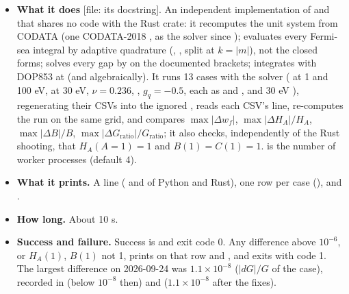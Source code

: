 \begin{itemize}
  \item \textbf{What it does} [file: its docstring]. An independent implementation of  and  that shares no code with the Rust crate: it recomputes the unit system from CODATA (one CODATA-2018 , as the solver since ); evaluates every Fermi-sea integral by adaptive quadrature (, , split at $k = |m|$), not the closed forms; solves every gap by  on the documented brackets; integrates  with DOP853 at  (and  algebraically). It runs 13 cases with the solver ( at 1 and 100 eV,  at 30 eV,  $\nu = 0.236$, ,  $g_q = -0.5$, each as  and , and  30 eV ), regenerating their CSVs into the ignored , reads each CSV's  line, re-computes the run on the same grid, and compares $\max |\Delta w_f|$, $\max |\Delta H_A|/H_A$, $\max |\Delta B|/B$, $\max |\Delta G_{\mathrm{ratio}}|/G_{\mathrm{ratio}}$; it also checks, independently of the Rust shooting, that $H_A(A = 1) = 1$ and $B(1) = C(1) = 1$.  is the number of worker processes (default 4).
  \item \textbf{What it prints.} A  line ( and  of Python and Rust), one row per case (), and .
  \item \textbf{How long.} About 10 s.
  \item \textbf{Success and failure.} Success is  and exit code 0. Any difference above $10^{-6}$, or $H_A(1)$, $B(1)$ not 1, prints  on that row and , and exits with code 1. The largest difference on 2026-09-24 was $1.1\times10^{-8}$ ($|dG|/G$ of the   case), recorded in  (below $10^{-8}$ then) and  ($1.1\times10^{-8}$ after the fixes).
\end{itemize}

